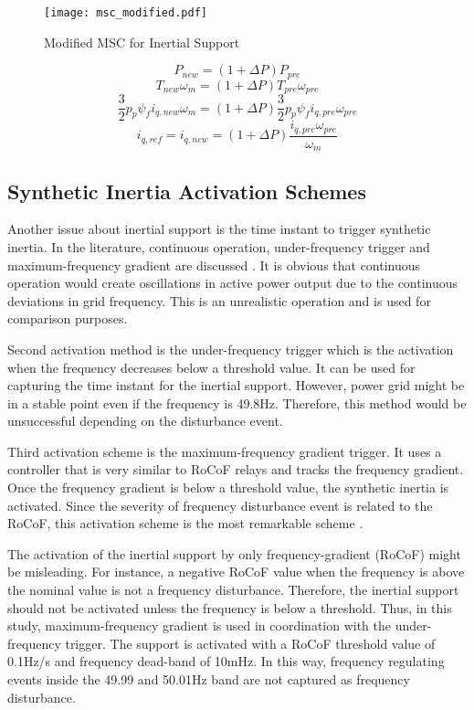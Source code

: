 \begin{figure}[h!]
	\centering
	\texttt{[image: msc\_modified.pdf]}
	\caption{Modified MSC for Inertial Support}
	\label{modifiedmsc}
\end{figure}
\begin{equation}
P_{new}=(1+\Delta P) P_{pre}
\label{inertialsupport1}
\end{equation}
\begin{equation}
T_{new} \omega_{m}=(1+\Delta P) T_{pre} \omega_{pre}
\label{inertialsupport2}
\end{equation}
\begin{equation}
\frac{3}{2} p_{p} \psi_{f} i_{q,new} \omega_{m}=(1+\Delta P) \frac{3}{2} p_{p} \psi_{f} i_{q,pre} \omega_{pre}
\label{inertialsupport3}
\end{equation}
\begin{equation}
 i_{q,ref}=i_{q,new}=(1+\Delta P) \frac{i_{q,pre} \omega_{pre}}{ \omega_{m}} 
\label{inertialsupport4}
\end{equation}
\subsection{Synthetic Inertia Activation Schemes}
Another issue about inertial support is the time instant to trigger synthetic inertia. In the literature, continuous operation, under-frequency trigger and maximum-frequency gradient are discussed \cite{Gonzalez-longatt2015}. It is obvious that continuous operation would create oscillations in active power output due to the continuous deviations in grid frequency. This is an unrealistic operation and is used for comparison purposes.\par
Second activation method is the under-frequency trigger which is the activation when the frequency decreases below a threshold value. It can be used for capturing the time instant for the inertial support. However, power grid might be in a stable point even if the frequency is 49.8Hz. Therefore, this method would be unsuccessful depending on the disturbance event. \par 
Third activation scheme is the maximum-frequency gradient trigger. It uses a controller that is very similar to RoCoF relays and tracks the frequency gradient. Once the frequency gradient is below a threshold value, the synthetic inertia is activated. Since the severity of frequency disturbance event is related to the RoCoF, this activation scheme is the most remarkable scheme \cite{Gonzalez-longatt2015}. \par The activation of the inertial support by only frequency-gradient (RoCoF) might be misleading. For instance, a negative RoCoF value when the frequency is above the nominal value is not a frequency disturbance. Therefore, the inertial support should not be activated unless the frequency is below a threshold. Thus, in this study, maximum-frequency gradient is used in coordination with the under-frequency trigger. The support is activated with a RoCoF threshold value of 0.1Hz/s and frequency dead-band of 10mHz. In this way, frequency regulating events inside the 49.99 and 50.01Hz band are not captured as frequency disturbance.
